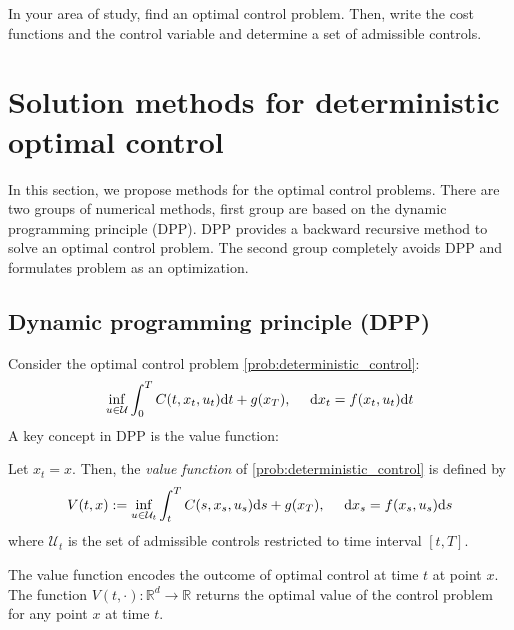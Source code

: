 \documentclass[11pt]{book}
\newcommand{\dt}{\text{\normalfont d}t}
\newcommand{\ds}{\text{\normalfont d}s}
\newcommand{\dx}{\text{\normalfont d}x}
\begin{document}
\begin{ex}
    In your area of study, find an optimal control problem. Then, write the cost functions and the control variable and determine a set of admissible controls. 
\end{ex}



\section{Solution methods for deterministic optimal control}
\label{sec:sol_deter}
In this section, we propose methods for the optimal control problems. There are two groups of numerical methods, first group are based on the dynamic programming principle (DPP). DPP provides a backward recursive method to solve an optimal control problem.  The second group completely avoids DPP and formulates problem as an optimization. 
\subsection{Dynamic programming principle (DPP)}
\label{sec:dpp_deter}
Consider the optimal control problem \eqref{prob:deterministic_control}:
\begin{equation}
    \inf_{u\in\mathcal{U}}\int_0^TC(t,x_t,u_t){{\dt}}+g(x_T),~~~~{\dx}_t=f(x_t,u_t){{\dt}}
\end{equation}
A key concept in DPP is the value function:
\begin{defn}
Let $x_t=x$. Then, the \emph{value function} of \eqref{prob:deterministic_control} is defined by
\begin{equation}\label{eqn:value_deterministic}
    V(t,x):= \inf_{u\in\mathcal{U}_{t}}\int_t^TC(s,x_s,u_s){{\ds}}+g(x_T),~~~~{\dx}_s=f(x_s,u_s){{\ds}}
\end{equation}
where $\mathcal{U}_{t}$ is the set of admissible controls restricted to time interval $[t,T]$.
\end{defn}
The value function encodes the outcome of optimal control at time $t$ at point $x$. The function $V(t,\cdot):\mathbb{R}^d\to\mathbb{R}$ returns the optimal value of the control problem for any point $x$ at time $t$.
\end{document}

